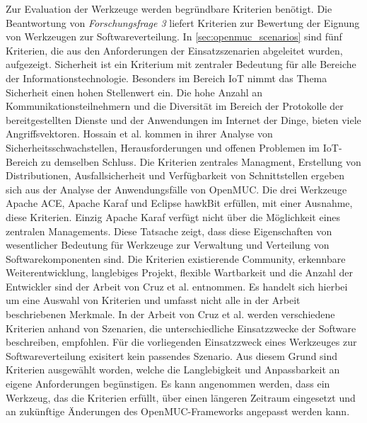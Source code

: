 Zur Evaluation der Werkzeuge werden begründbare Kriterien benötigt.
Die Beantwortung von \textit{Forschungsfrage 3} liefert Kriterien zur Bewertung der Eignung von Werkzeugen zur Softwareverteilung.
In \autoref{sec:openmuc_scenarios} sind fünf Kriterien, die aus den Anforderungen der Einsatzszenarien abgeleitet wurden, aufgezeigt.
Sicherheit ist ein Kriterium mit zentraler Bedeutung für alle Bereiche der Informationstechnologie.
Besonders im Bereich \ac{IoT} nimmt das Thema Sicherheit einen hohen Stellenwert ein.
Die hohe Anzahl an Kommunikationsteilnehmern und die Diversität im Bereich der Protokolle
der bereitgestellten Dienste und der Anwendungen im Internet der Dinge, bieten viele Angriffsvektoren.
Hossain et al. \cite{iot_security_issues} kommen in ihrer Analyse von Sicherheitsschwachstellen, Herausforderungen und offenen Problemen im \ac{IoT}-Bereich zu demselben Schluss.
Die Kriterien zentrales Managment, Erstellung von Distributionen, Ausfallsicherheit und Verfügbarkeit von Schnittstellen ergeben sich aus der Analyse der 
Anwendungsfälle von OpenMUC. Die drei Werkzeuge Apache ACE, Apache Karaf und Eclipse hawkBit erfüllen, mit einer Ausnahme, diese Kriterien.
Einzig Apache Karaf verfügt nicht über die Möglichkeit eines zentralen Managements.
Diese Tatsache zeigt, dass diese Eigenschaften von wesentlicher Bedeutung für Werkzeuge zur Verwaltung und Verteilung von Softwarekomponenten sind.
Die Kriterien existierende Community, erkennbare Weiterentwicklung, langlebiges Projekt, flexible Wartbarkeit
und die Anzahl der Entwickler sind der Arbeit von Cruz et al. \cite{evaluation_criteria} entnommen.
Es handelt sich hierbei um eine Auswahl von Kriterien und umfasst nicht alle in der Arbeit beschriebenen Merkmale.
In der Arbeit von Cruz et al. werden verschiedene Kriterien anhand von Szenarien, die unterschiedliche Einsatzzwecke der Software beschreiben, empfohlen.
Für die vorliegenden Einsatzzweck eines Werkzeuges zur Softwareverteilung exisitert kein passendes Szenario.
Aus diesem Grund sind Kriterien ausgewählt worden, welche die Langlebigkeit und Anpassbarkeit an eigene Anforderungen begünstigen.
Es kann angenommen werden, dass ein Werkzeug, das die Kriterien erfüllt, über einen längeren Zeitraum eingesetzt und an zukünftige Änderungen
des OpenMUC-Frameworks angepasst werden kann.\\

